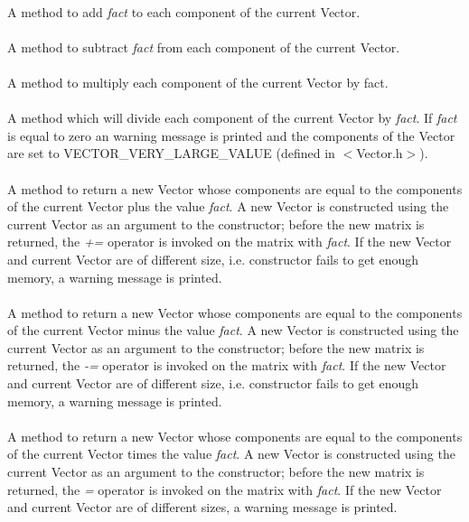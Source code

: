  \\
A method to add {\em fact} to each component of the current Vector. \\

 \\
A method to subtract {\em fact} from each component of the current Vector. \\

 \\
A method to multiply each component of the current Vector by fact. \\

 \\
A method which will divide each component of the current Vector by
{\em fact}. If {\em fact} is equal to zero an warning message is printed
and the components of the Vector are set to VECTOR\_VERY\_LARGE\_VALUE
(defined in $<$Vector.h$>$). \\

 \\
A method to return a new Vector whose components are equal to the
components of the current Vector plus the value {\em fact}. A new Vector
is constructed using the current Vector as an argument to the
constructor; before the new matrix is returned, the {\em +=} operator
is invoked on the matrix with {\em fact}. If the new Vector and
current Vector are of different size, i.e. constructor fails to get
enough memory, a warning message is printed. \\ 

 \\
A method to return a new Vector whose components are equal to the
components of the current Vector minus the value {\em fact}.  A new Vector
is constructed using the current Vector as an argument to the
constructor; before the new matrix is returned, the {\em -=} operator
is invoked on the matrix with {\em fact}. If the new Vector and
current Vector are of different size, i.e. constructor fails to get
enough memory, a warning message is printed. \\ 


 \\
A method to return a new Vector whose components are equal to the
components of the current Vector times the value {\em fact}.  A new Vector
is constructed using the current Vector as an argument to the
constructor; before the new matrix is returned, the {\em *=} operator
is invoked on the matrix with {\em fact}. If the new Vector and
current Vector are of different sizes, a warning message is printed. \\


